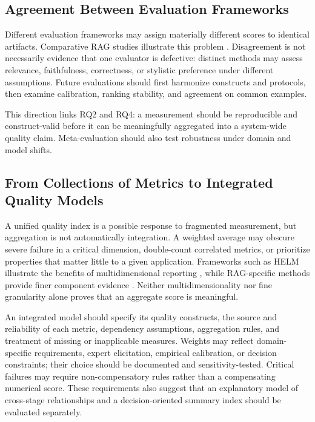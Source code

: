 \subsection{Agreement Between Evaluation Frameworks}

Different evaluation frameworks may assign materially different scores to identical artifacts. Comparative RAG studies illustrate this problem \cite{cho2026graphene,neloy2026metarag}. Disagreement is not necessarily evidence that one evaluator is defective: distinct methods may assess relevance, faithfulness, correctness, or stylistic preference under different assumptions. Future evaluations should first harmonize constructs and protocols, then examine calibration, ranking stability, and agreement on common examples.

This direction links RQ2 and RQ4: a measurement should be reproducible and construct-valid before it can be meaningfully aggregated into a system-wide quality claim. Meta-evaluation should also test robustness under domain and model shifts.

\subsection{From Collections of Metrics to Integrated Quality Models}

A unified quality index is a possible response to fragmented measurement, but aggregation is not automatically integration. A weighted average may obscure severe failure in a critical dimension, double-count correlated metrics, or prioritize properties that matter little to a given application. Frameworks such as HELM illustrate the benefits of multidimensional reporting \cite{liang2023helm}, while RAG-specific methods provide finer component evidence \cite{es2024ragas,ru2024ragchecker}. Neither multidimensionality nor fine granularity alone proves that an aggregate score is meaningful.

An integrated model should specify its quality constructs, the source and reliability of each metric, dependency assumptions, aggregation rules, and treatment of missing or inapplicable measures. Weights may reflect domain-specific requirements, expert elicitation, empirical calibration, or decision constraints; their choice should be documented and sensitivity-tested. Critical failures may require non-compensatory rules rather than a compensating numerical score. These requirements also suggest that an explanatory model of cross-stage relationships and a decision-oriented summary index should be evaluated separately.

